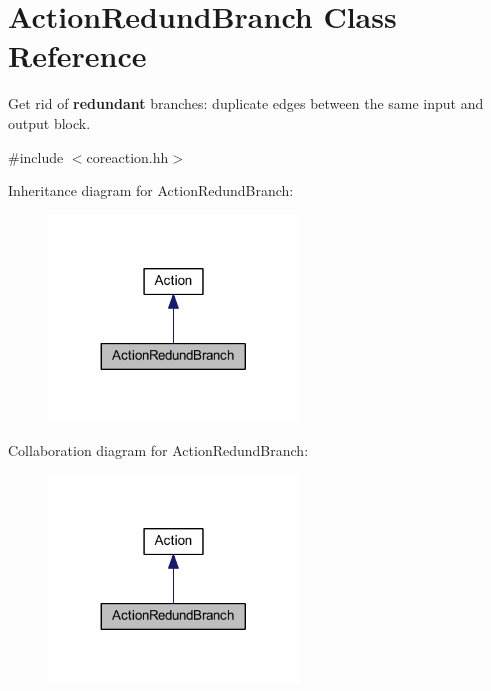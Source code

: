 \hypertarget{class_action_redund_branch}{}\section{Action\+Redund\+Branch Class Reference}
\label{class_action_redund_branch}


Get rid of {\bfseries{redundant}} branches\+: duplicate edges between the same input and output block.  




{\ttfamily \#include $<$coreaction.\+hh$>$}



Inheritance diagram for Action\+Redund\+Branch\+:
\nopagebreak
\begin{figure}[H]
\begin{center}
\leavevmode
\includegraphics[width=188pt]{class_action_redund_branch__inherit__graph}
\end{center}
\end{figure}


Collaboration diagram for Action\+Redund\+Branch\+:
\nopagebreak
\begin{figure}[H]
\begin{center}
\leavevmode
\includegraphics[width=188pt]{class_action_redund_branch__coll__graph}
\end{center}
\end{figure}
